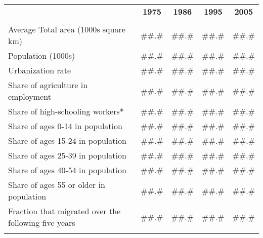 \begin{tabular}{rcccc}
\toprule
      & \textbf{1975} & \textbf{1986} & \textbf{1995} & \textbf{2005} \\
\cmidrule{2-5}      &       &       &       &  \\
\multicolumn{1}{l}{Average Total area (1000s square km)} & \#\#.\# & \#\#.\# & \#\#.\# & \#\#.\# \\
\multicolumn{1}{l}{Population (1000s)} & \#\#.\# & \#\#.\# & \#\#.\# & \#\#.\# \\
\multicolumn{1}{l}{Urbanization rate} & \#\#.\# & \#\#.\# & \#\#.\# & \#\#.\# \\
\multicolumn{1}{l}{Share of agriculture in employment} & \#\#.\# & \#\#.\# & \#\#.\# & \#\#.\# \\
\multicolumn{1}{l}{Share of high-schooling workers*} & \#\#.\# & \#\#.\# & \#\#.\# & \#\#.\# \\
\multicolumn{1}{l}{Share of ages 0-14 in population} & \#\#.\# & \#\#.\# & \#\#.\# & \#\#.\# \\
\multicolumn{1}{l}{Share of ages 15-24 in population} & \#\#.\# & \#\#.\# & \#\#.\# & \#\#.\# \\
\multicolumn{1}{l}{Share of ages 25-39 in population} & \#\#.\# & \#\#.\# & \#\#.\# & \#\#.\# \\
\multicolumn{1}{l}{Share of ages 40-54 in population} & \#\#.\# & \#\#.\# & \#\#.\# & \#\#.\# \\
\multicolumn{1}{l}{Share of ages 55 or older in population} & \#\#.\# & \#\#.\# & \#\#.\# & \#\#.\# \\
\multicolumn{1}{l}{Fraction that migrated over the following five years} & \#\#.\# & \#\#.\# & \#\#.\# & \#\#.\# \\
      &       &       &       &  \\
\bottomrule
\end{tabular}%
